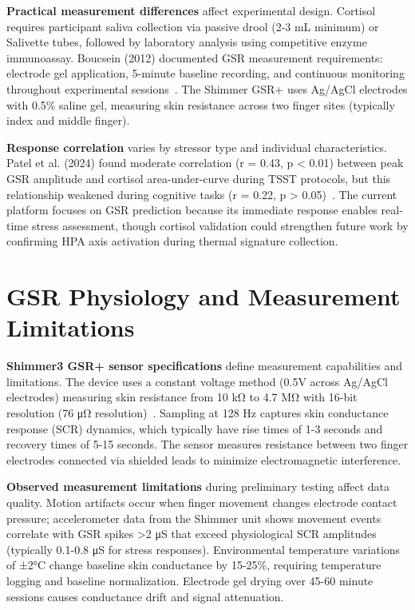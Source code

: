 \textbf{Practical measurement differences} affect experimental design. Cortisol requires participant saliva collection via passive drool (2-3 mL minimum) or Salivette tubes, followed by laboratory analysis using competitive enzyme immunoassay. Boucsein (2012) documented GSR measurement requirements: electrode gel application, 5-minute baseline recording, and continuous monitoring throughout experimental sessions~\cite{boucsein2012electrodermal}. The Shimmer GSR+ uses Ag/AgCl electrodes with 0.5\% saline gel, measuring skin resistance across two finger sites (typically index and middle finger).

\textbf{Response correlation} varies by stressor type and individual characteristics. Patel et al. (2024) found moderate correlation (r = 0.43, p < 0.01) between peak GSR amplitude and cortisol area-under-curve during TSST protocols, but this relationship weakened during cognitive tasks (r = 0.22, p > 0.05)~\cite{patel2024electrodermal}. The current platform focuses on GSR prediction because its immediate response enables real-time stress assessment, though cortisol validation could strengthen future work by confirming HPA axis activation during thermal signature collection.

\section{GSR Physiology and Measurement Limitations}

\textbf{Shimmer3 GSR+ sensor specifications} define measurement capabilities and limitations. The device uses a constant voltage method (0.5V across Ag/AgCl electrodes) measuring skin resistance from 10 kΩ to 4.7 MΩ with 16-bit resolution (76 μΩ resolution)~\cite{shimmer2025gsr}. Sampling at 128 Hz captures skin conductance response (SCR) dynamics, which typically have rise times of 1-3 seconds and recovery times of 5-15 seconds. The sensor measures resistance between two finger electrodes connected via shielded leads to minimize electromagnetic interference.

\textbf{Observed measurement limitations} during preliminary testing affect data quality. Motion artifacts occur when finger movement changes electrode contact pressure; accelerometer data from the Shimmer unit shows movement events correlate with GSR spikes >2 μS that exceed physiological SCR amplitudes (typically 0.1-0.8 μS for stress responses). Environmental temperature variations of ±2°C change baseline skin conductance by 15-25\%, requiring temperature logging and baseline normalization. Electrode gel drying over 45-60 minute sessions causes conductance drift and signal attenuation.

